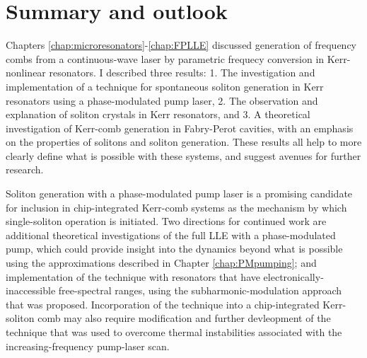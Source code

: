  \chapter{Summary and outlook}\label{chap:conclusion}

Chapters \ref{chap:microresonators}-\ref{chap:FPLLE} discussed generation of frequency combs from a continuous-wave laser by parametric frequecy conversion in Kerr-nonlinear resonators. I described three results: 1. The investigation and implementation of a technique for spontaneous soliton generation in Kerr resonators using a phase-modulated pump laser, 2. The observation and explanation of soliton crystals in Kerr resonators, and 3. A theoretical investigation of Kerr-comb generation in Fabry-Perot cavities, with an emphasis on the properties of solitons and soliton generation. These results all help to more clearly define what is possible with these systems, and suggest avenues for further research. 

Soliton generation with a phase-modulated pump laser is a promising candidate for inclusion in chip-integrated Kerr-comb systems as the mechanism by which single-soliton operation is initiated. Two directions for continued work are additional theoretical investigations of the full LLE with a phase-modulated pump, which could provide insight into the dynamics beyond what is possible using the approximations described in Chapter \ref{chap:PMpumping}; and implementation of the technique with resonators that have electronically-inaccessible free-spectral ranges, using the subharmonic-modulation approach that was proposed. Incorporation of the technique into a chip-integrated Kerr-soliton comb may also require modification and further devleopment of the technique that was used to overcome thermal instabilities associated with the increasing-frequency pump-laser scan.

